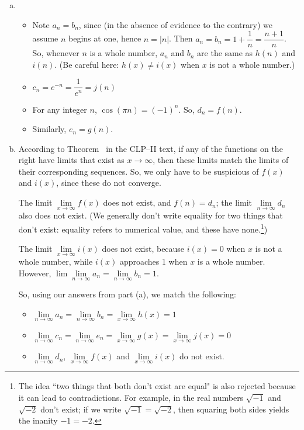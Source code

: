 \begin{solution}
\begin{enumerate}[(a)]
\item
\begin{itemize}
\item Note $a_n=b_n$, since (in the absence of evidence to the contrary) we assume $n$ begins at one, hence $n=|n|$. Then $a_n=b_n=1+\dfrac{1}{n}=\dfrac{n+1}{n}$. So, whenever $n$ is a whole number, $a_n$ and $b_n$ are the same as $h(n)$ and $i(n)$. (Be careful here: $h(x) \neq i(x)$ when $x$ is not a whole number.)
\item $c_n=e^{-n}=\dfrac{1}{e^n}=j(n)$
\item For any integer $n$, $\cos(\pi n) = (-1)^n$. So, $d_n = f(n)$.
\item Similarly, $e_n=g(n)$.
\end{itemize}
\item
According to Theorem~ in the CLP--II text, if any of the functions on the right have limits that exist as $x \to \infty$, then these limits match the limits of their corresponding sequences. So, we only have to be suspicious of $f(x)$ and $i(x)$, since these do not converge.

The limit $\lim\limits_{x \to \infty}f(x)$ does not exist, and $f(n)=d_n$; the limit $\lim\limits_{n \to \infty}d_n$ also does not exist. (We generally don't write equality for two things that don't exist: equality refers to numerical value, and these have none.\footnote{The idea  ``two things that both don't exist are equal" is also rejected because it can lead to contradictions. For example, in the real numbers $\sqrt{-1}$ and $\sqrt{-2}$ don't exist; if we write $\sqrt{-1}=\sqrt{-2}$, then squaring both sides yields the inanity $-1=-2$.})

The limit $\lim\limits_{x \to \infty}i(x)$ does not exist, because $i(x)=0$ when $x$ is not a whole number, while $i(x)$ approaches 1 when $x$ is a whole number. However, $\lim\lim\limits_{n \to \infty}a_n=\lim\limits_{n \to \infty}b_n=1$.

So, using our answers from part (a), we match the following:
\begin{itemize}
\item $\lim\limits_{n \to \infty}a_n=\lim\limits_{n \to \infty}b_n=\lim\limits_{x \to \infty}h(x)=1$
\item $\lim\limits_{n \to \infty}c_n=\lim\limits_{n \to \infty}e_n=\lim\limits_{x \to \infty}g(x)=\lim\limits_{x \to \infty}j(x)=0$
\item $\lim\limits_{n \to \infty} d_n$,  $\lim\limits_{x\rightarrow\infty} f(x)$  and $\lim\limits_{x\rightarrow\infty} i(x)$ do not exist.
\end{itemize}
\end{enumerate}
\end{solution}

